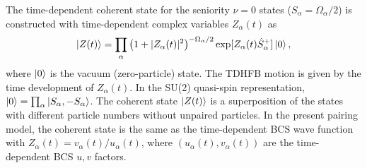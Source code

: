 \documentclass[%
superscriptaddress,
showpacs,
nofootinbib,
amsmath,amssymb,
aps,
prc,
twocolumn,
floatfix ]%
{revtex4-1}
\begin{document}
The time-dependent coherent state for the seniority $\nu=0$ states
($S_\alpha=\Omega_\alpha/2$) is constructed with
time-dependent complex variables $Z_\alpha(t)$ as
\begin{equation}
	\ket{Z(t)} = \prod_{\alpha} \left(1+|Z_\alpha(t)|^2\right)^{-\Omega_\alpha/2}
	\exp [Z_\alpha(t) \hat{S}_\alpha^{+}] \ket{0},
 \label{coherent}
\end{equation}
where $\ket{0}$ is the vacuum (zero-particle) state.
The TDHFB motion is given by the time development of $Z_\alpha(t)$.
In the SU(2) quasi-spin representation,
$\ket{0}=\prod_\alpha \ket{S_\alpha,-S_\alpha}$.
The coherent state $\ket{Z(t)}$ is a superposition of
the states with different particle numbers
without unpaired particles.
In the present pairing model,
the coherent state is the same as the time-dependent BCS wave function
with $Z_\alpha(t)=v_\alpha(t)/u_\alpha(t)$,
where $(u_\alpha(t),v_\alpha(t))$ are the time-dependent BCS $u,v$ factors.
\end{document}
